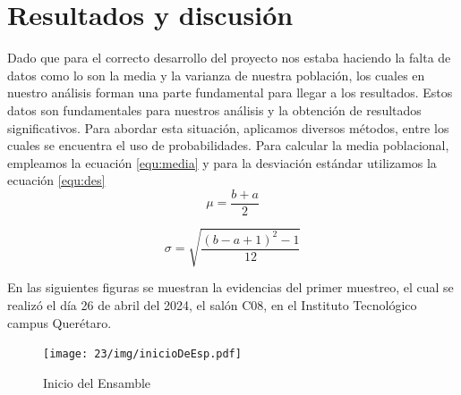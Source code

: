     \section{Resultados y discusión}
    
   Dado que para el correcto desarrollo del proyecto nos estaba haciendo la falta de datos como lo son la media y la varianza de nuestra población, los cuales en nuestro análisis forman una parte fundamental para llegar a los resultados. Estos datos son fundamentales para nuestros análisis y la obtención de resultados significativos. Para abordar esta situación, aplicamos diversos métodos, entre los cuales se encuentra el uso de probabilidades. Para calcular la media poblacional, empleamos la ecuación \ref{equ:media} y para  la desviación estándar utilizamos la ecuación \ref{equ:des}
        \begin{equation}
            \label{equ:media}
           \mu = \dfrac{b+a}{2}
        \end{equation}
    
      \begin{equation}
            \label{equ:des}
            \sigma = \sqrt{\dfrac{(b-a+1)^2-1}{12}}
        \end{equation}
    
    
    
    En las siguientes figuras se muestran la evidencias del primer muestreo, el cual se realizó el día 26 de abril del 2024, el salón C08, en el Instituto Tecnológico campus Querétaro.
    
    \begin{figure}[H]
        \centering
        \texttt{[image: 23/img/inicioDeEsp.pdf]}
        \caption{Inicio del Ensamble}
        \label{fig:evi1}
    \end{figure}
       
